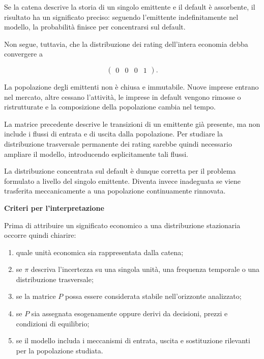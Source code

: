 Se la catena descrive la storia di un singolo emittente e il default
\`{e} assorbente, il risultato ha un significato preciso: seguendo
l'emittente indefinitamente nel modello, la probabilit\`{a} finisce per
concentrarsi sul default.

Non segue, tuttavia, che la distribuzione dei rating dell'intera
economia debba convergere a

\[
\begin{pmatrix}
0&0&0&1
\end{pmatrix}.
\]

La popolazione degli emittenti non \`{e} chiusa e immutabile. Nuove
imprese entrano nel mercato, altre cessano l'attivit\`{a}, le imprese in
default vengono rimosse o ristrutturate e la composizione della
popolazione cambia nel tempo.

La matrice precedente descrive le transizioni di un emittente gi\`{a}
presente, ma non include i flussi di entrata e di uscita dalla
popolazione. Per studiare la distribuzione trasversale permanente dei
rating sarebbe quindi necessario ampliare il modello, introducendo
esplicitamente tali flussi.

La distribuzione concentrata sul default \`{e} dunque corretta per il
problema formulato a livello del singolo emittente. Diventa invece
inadeguata se viene trasferita meccanicamente a una popolazione
continuamente rinnovata.

\noindent\textbf{Criteri per l'interpretazione}

Prima di attribuire un significato economico a una distribuzione
stazionaria occorre quindi chiarire:

\begin{enumerate}

\item quale unit\`{a} economica sia rappresentata dalla catena;

\item se \(\pi\) descriva l'incertezza su una singola unit\`{a}, una
frequenza temporale o una distribuzione trasversale;

\item se la matrice \(P\) possa essere considerata stabile
nell'orizzonte analizzato;

\item se \(P\) sia assegnata esogenamente oppure derivi da decisioni,
prezzi e condizioni di equilibrio;

\item se il modello includa i meccanismi di entrata, uscita e
sostituzione rilevanti per la popolazione studiata.
\end{enumerate}


